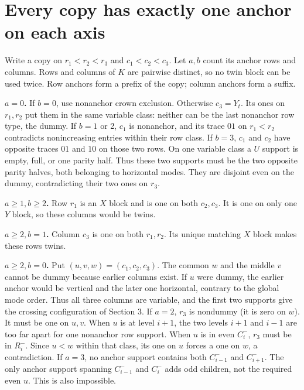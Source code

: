 \documentclass[11pt,letterpaper]{article}
\begin{document}
\section{Every copy has exactly one anchor on each
axis}\label{every-copy-has-exactly-one-anchor-on-each-axis}

Write a copy on \(r_{1}<r_{2}<r_{3}\) and \(c_{1}<c_{2}<c_{3}\). Let
\(a,b\) count its anchor rows and columns. Rows and columns of \(K\) are
pairwise distinct, so no twin block can be used twice. Row anchors form
a prefix of the copy; column anchors form a suffix.

\textbf{\boldmath \(a=0\).} If \(b=0\), use nonanchor crown exclusion.
Otherwise \(c_{3}=Y_t\). Its ones on \(r_{1},r_{2}\) put them in the
same variable class: neither can be the last nonanchor row type, the
dummy. If \(b=1\) or 2, \(c_{1}\) is nonanchor, and its trace \(01\) on
\(r_{1}<r_{2}\) contradicts nonincreasing entries within their row
class. If \(b=3\), \(c_{1}\) and \(c_{2}\) have opposite traces \(01\)
and \(10\) on those two rows. On one variable class a \(U\) support is
empty, full, or one parity half. Thus these two supports must be the two
opposite parity halves, both belonging to horizontal modes. They are
disjoint even on the dummy, contradicting their two ones on \(r_{3}\).

\textbf{\boldmath \(a\ge 1, b\ge 2\).} Row \(r_{1}\) is an \(X\) block
and is one on both \(c_{2},c_{3}\). It is one on only one \(Y\) block,
so these columns would be twins.

\textbf{\boldmath \(a\ge 2, b=1\).} Column \(c_{3}\) is one on both
\(r_{1},r_{2}\). Its unique matching \(X\) block makes these rows twins.

\textbf{\boldmath \(a\ge 2, b=0\).} Put \((u,v,w)=(c_{1},c_{2},c_{3})\).
The common \(w\) and the middle \(v\) cannot be dummy because earlier
columns exist. If \(u\) were dummy, the earlier anchor would be vertical
and the later one horizontal, contrary to the global mode order. Thus
all three columns are variable, and the first two supports give the
crossing configuration of Section 3. If \(a=2\), \(r_{3}\) is nondummy
(it is zero on \(w\)). It must be one on \(u,v\). When \(u\) is at level
\(i+1\), the two levels \(i+1\) and \(i-1\) are too far apart for one
nonanchor row support. When \(u\) is in even \(C_i^-\), \(r_{3}\) must
be in \(R_i^-\). Since \(u<w\) within that class, its one on \(u\)
forces a one on \(w\), a contradiction. If \(a=3\), no anchor support
contains both \(C_{i-1}^-\) and \(C_{i+1}^-\). The only anchor support
spanning \(C_{i-1}^-\) and \(C_i^-\) adds odd children, not the required
even \(u\). This is also impossible.
\end{document}

